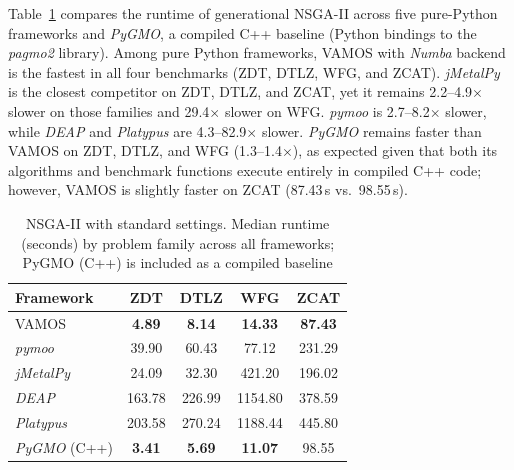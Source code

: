 \documentclass[final,5p,times,twocolumn]{elsarticle}
\newcommand{\VAMOS}{VAMOS}
\begin{document}
Table~\ref{tab:frameworks_perf} compares the runtime of generational NSGA-II across five pure-Python frameworks and \textit{PyGMO}, a compiled C++ baseline (Python bindings to the \textit{pagmo2} library). Among pure Python frameworks, \VAMOS{} with \textit{Numba} backend is the fastest in all four benchmarks (ZDT, DTLZ, WFG, and ZCAT). \textit{jMetalPy} is the closest competitor on ZDT, DTLZ, and ZCAT, yet it remains 2.2--4.9$\times$ slower on those families and 29.4$\times$ slower on WFG. \textit{pymoo} is 2.7--8.2$\times$ slower, while \textit{DEAP} and \textit{Platypus} are 4.3--82.9$\times$ slower. \textit{PyGMO} remains faster than \VAMOS{} on ZDT, DTLZ, and WFG (1.3--1.4$\times$), as expected given that both its algorithms and benchmark functions execute entirely in compiled C++ code; however, \VAMOS{} is slightly faster on ZCAT (87.43\,s vs.\ 98.55\,s).

\begin{table}[htbp]
\centering
\caption{NSGA-II with standard settings. Median runtime (seconds) by problem family across all frameworks; PyGMO (C++) is included as a compiled baseline}
\label{tab:frameworks_perf}
\begin{tabular}{lcccc}
\toprule
\textbf{Framework} & \textbf{ZDT} & \textbf{DTLZ} & \textbf{WFG} & \textbf{ZCAT} \\
\midrule
VAMOS & \textbf{4.89} & \textbf{8.14} & \textbf{14.33} & \textbf{87.43} \\
\textit{pymoo} & 39.90 & 60.43 & 77.12 & 231.29 \\
\textit{jMetalPy} & 24.09 & 32.30 & 421.20 & 196.02 \\
\textit{DEAP} & 163.78 & 226.99 & 1154.80 & 378.59 \\
\textit{Platypus} & 203.58 & 270.24 & 1188.44 & 445.80 \\
\midrule
\textit{PyGMO} (C++) & \textbf{3.41} & \textbf{5.69} & \textbf{11.07} & 98.55 \\
\bottomrule
\end{tabular}
\end{table}
\end{document}
